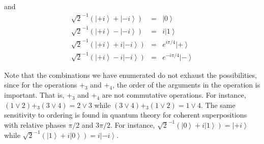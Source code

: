 \documentclass[pra,nofootinbib,showpacs,12pt]{revtex4}
\begin{document}
and
\begin{eqnarray}
\sqrt{2}^{-1}\left( \left| +i\right\rangle +\left| -i\right\rangle \right)
&=&\left| 0\right\rangle  \label{cs9} \\
\sqrt{2}^{-1}\left( \left| +i\right\rangle -\left| -i\right\rangle \right)
&=&i\left| 1\right\rangle  \label{cs10} \\
\sqrt{2}^{-1}\left( \left| +i\right\rangle +i\left| -i\right\rangle \right)
&=&e^{i\pi /4}\left| +\right\rangle  \label{cs11} \\
\sqrt{2}^{-1}\left( \left| +i\right\rangle -i\left| -i\right\rangle \right)
&=&e^{-i\pi /4}\left| -\right\rangle  \label{cs12}
\end{eqnarray}

Note that the combinations we have enumerated do not exhaust the
possibilities, since for the operations $+_{3}$ and $+_{4}$, the order of
the arguments in the operation is important. That is, $+_{3}$ and $+_{4}$
are not commutative operations. For instance, $(1\vee 2)+_{3}(3\vee 4)=2\vee
3$ while $(3\vee 4)+_{3}(1\vee 2)=1\vee 4.$ The same sensitivity to ordering
is found in quantum theory for coherent superpositions with relative phases $%
\pi /2$ and $3\pi /2$. For instance, $\sqrt{2}^{-1}\left( \left|
0\right\rangle +i\left| 1\right\rangle \right) =\left| +i\right\rangle $
while $\sqrt{2}^{-1}\left( \left| 1\right\rangle +i\left| 0\right\rangle
\right) =i\left| -i\right\rangle .$
\end{document}
